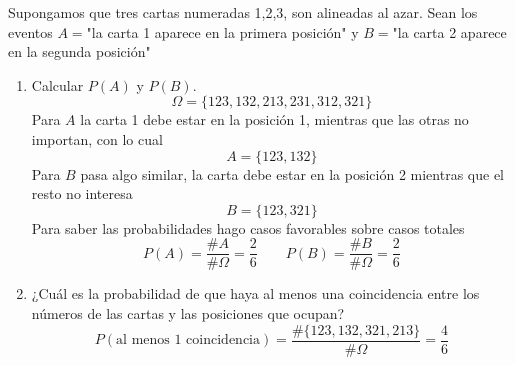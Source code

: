 \item Supongamos que tres cartas numeradas 1,2,3, son alineadas al azar. Sean los eventos $A=$"la carta 1 aparece en la primera posición" y $B=$"la carta 2 aparece en la segunda posición"
    \begin{enumerate}
        \item Calcular $P(A)$ y $P(B)$.
            \[\Omega=\{123,132,213,231,312,321\}\]
            Para $A$ la carta 1 debe estar en la posición 1, mientras que las otras no importan, con lo cual\[A=\{123,132\}\]
            Para $B$ pasa algo similar, la carta debe estar en la posición 2 mientras que el resto no interesa \[B=\{123,321\}\]
            Para saber las probabilidades hago casos favorables sobre casos totales\[P(A)=\frac{\#A}{\#\Omega}=\frac{2}{6}\qquad P(B)=\frac{\#B}{\#\Omega}=\frac{2}{6}\]
        \item ¿Cuál es la probabilidad de que haya al menos una coincidencia entre los números de las cartas y las posiciones que ocupan?
            \[P(\text{al menos 1 coincidencia})=\frac{\#\{123,132,321,213\}}{\#\Omega}=\frac{4}{6}\]
    \end{enumerate}